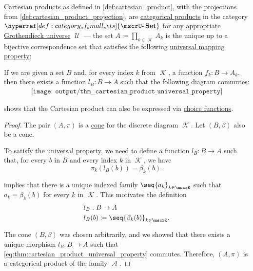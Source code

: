 \begin{theorem}\label{thm:cartesian_product_universal_property}
  Cartesian products as defined in \cref{def:cartesian_product}, with the projections from \cref{def:cartesian_product_projection}, are \hyperref[def:discrete_category_limits]{categorical products} in the category \( \hyperref[def:category_of_small_sets]{\ucat{Set}} \) for any appropriate \hyperref[def:grothendieck_universe]{Grothendieck universe} \( \mscrU \) --- the set \( A \coloneqq \prod_{k \in \mscrK} A_k \) is the unique up to a bijective correspondence set that satisfies the following \hyperref[rem:universal_mapping_property]{universal mapping property}:
  \begin{displayquote}
    If we are given a set \( B \) and, for every index \( k \) from \( \mscrK \), a function \( f_k: B \to A_k \), then there exists a function \( l_B: B \to A \) such that the following diagram commutes:
    \begin{equation}\label{eq:thm:cartesian_product_universal_property}
      \begin{aligned}
        \texttt{[image: output/thm\_\_cartesian\_product\_universal\_property]}
      \end{aligned}
    \end{equation}
  \end{displayquote}
\end{theorem}
\begin{comments}
  \item {} shows that the Cartesian product can also be expressed via \hyperref[def:choice_function]{choice functions}.
\end{comments}
\begin{proof}
  The pair \( (A, \pi) \) is a \hyperref[def:category_of_cones/cone]{cone} for the discrete diagram \( \mscrK \). Let \( (B, \beta) \) also be a cone.

  To satisfy the universal property, we need to define a function \( l_B: B \to A \) such that, for every \( b \) in \( B \) and every index \( k \) in \( \mscrK \), we have
  \begin{equation*}
    \pi_k(l_B(b)) = \beta_k(b).
  \end{equation*}

   implies that there is a unique indexed family \( \seq{ a_k }_{k \in \mscrK} \) such that \( a_k = \beta_k(b) \) for every \( k \) in \( \mscrK \). This motivates the definition
  \begin{equation*}
    \begin{aligned}
      &l_B: B \to A \\
      &l_B(b) \coloneqq \seq{ \beta_k(b) }_{k \in \mscrK}.
    \end{aligned}
  \end{equation*}

  The cone \( (B, \beta) \) was chosen arbitrarily, and we showed that there exists a unique morphism \( l_B: B \to A \) such that \eqref{eq:thm:cartesian_product_universal_property} commutes. Therefore, \( (A, \pi) \) is a categorical product of the family \( \mscrA \).
\end{proof}

